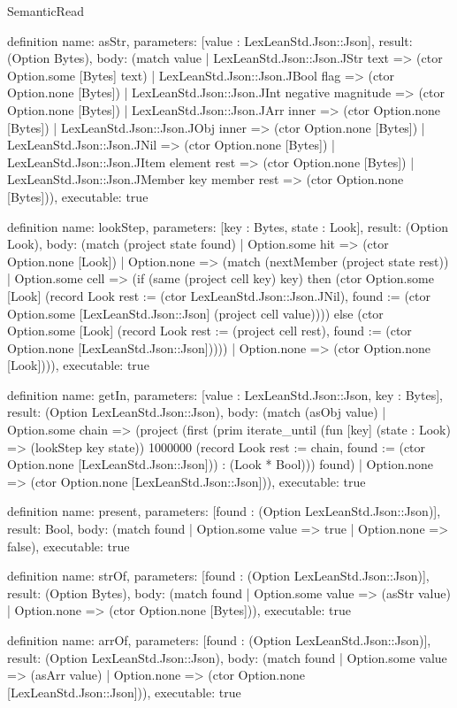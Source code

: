 \begin{lexlean}{SemanticRead}
\begin{semanticmodule}
definition{
  name: asStr,
  parameters: [value : LexLeanStd.Json::Json],
  result: (Option Bytes),
  body: (match value
    | LexLeanStd.Json::Json.JStr text => (ctor Option.some [Bytes] text)
    | LexLeanStd.Json::Json.JBool flag => (ctor Option.none [Bytes])
    | LexLeanStd.Json::Json.JInt negative magnitude => (ctor Option.none [Bytes])
    | LexLeanStd.Json::Json.JArr inner => (ctor Option.none [Bytes])
    | LexLeanStd.Json::Json.JObj inner => (ctor Option.none [Bytes])
    | LexLeanStd.Json::Json.JNil => (ctor Option.none [Bytes])
    | LexLeanStd.Json::Json.JItem element rest => (ctor Option.none [Bytes])
    | LexLeanStd.Json::Json.JMember key member rest => (ctor Option.none [Bytes])),
  executable: true
}

definition{
  name: lookStep,
  parameters: [key : Bytes, state : Look],
  result: (Option Look),
  body: (match (project state found)
    | Option.some hit => (ctor Option.none [Look])
    | Option.none => (match (nextMember (project state rest))
      | Option.some cell => (if (same (project cell key) key) then (ctor Option.some [Look] (record Look {rest := (ctor LexLeanStd.Json::Json.JNil), found := (ctor Option.some [LexLeanStd.Json::Json] (project cell value))})) else (ctor Option.some [Look] (record Look {rest := (project cell rest), found := (ctor Option.none [LexLeanStd.Json::Json])})))
      | Option.none => (ctor Option.none [Look]))),
  executable: true
}

definition{
  name: getIn,
  parameters: [value : LexLeanStd.Json::Json, key : Bytes],
  result: (Option LexLeanStd.Json::Json),
  body: (match (asObj value)
    | Option.some chain => (project (first (prim iterate_until (fun [key] (state : Look) => (lookStep key state)) 1000000 (record Look {rest := chain, found := (ctor Option.none [LexLeanStd.Json::Json])}) : (Look * Bool))) found)
    | Option.none => (ctor Option.none [LexLeanStd.Json::Json])),
  executable: true
}

definition{
  name: present,
  parameters: [found : (Option LexLeanStd.Json::Json)],
  result: Bool,
  body: (match found | Option.some value => true | Option.none => false),
  executable: true
}

definition{
  name: strOf,
  parameters: [found : (Option LexLeanStd.Json::Json)],
  result: (Option Bytes),
  body: (match found
    | Option.some value => (asStr value)
    | Option.none => (ctor Option.none [Bytes])),
  executable: true
}

definition{
  name: arrOf,
  parameters: [found : (Option LexLeanStd.Json::Json)],
  result: (Option LexLeanStd.Json::Json),
  body: (match found
    | Option.some value => (asArr value)
    | Option.none => (ctor Option.none [LexLeanStd.Json::Json])),
  executable: true
}


\end{semanticmodule}
\end{lexlean}
